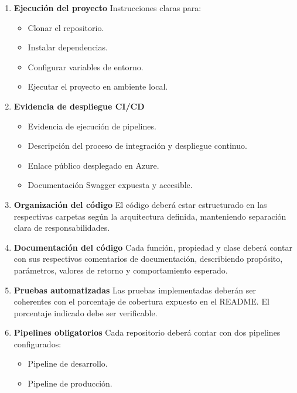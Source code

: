 \documentclass[12pt]{article}
\begin{document}
\begin{enumerate}
    \item \textbf{Ejecución del proyecto}  
    Instrucciones claras para:
    \begin{itemize}
        \item Clonar el repositorio.
        \item Instalar dependencias.
        \item Configurar variables de entorno.
        \item Ejecutar el proyecto en ambiente local.
    \end{itemize}

    \item \textbf{Evidencia de despliegue CI/CD}  
    \begin{itemize}
        \item Evidencia de ejecución de pipelines.
        \item Descripción del proceso de integración y despliegue continuo.
        \item Enlace público desplegado en Azure.
        \item Documentación Swagger expuesta y accesible.
    \end{itemize}

    \item \textbf{Organización del código}  
    El código deberá estar estructurado en las respectivas carpetas según la arquitectura definida, manteniendo separación clara de responsabilidades.

    \item \textbf{Documentación del código}  
    Cada función, propiedad y clase deberá contar con sus respectivos comentarios de documentación, describiendo propósito, parámetros, valores de retorno y comportamiento esperado.

    \item \textbf{Pruebas automatizadas}  
    Las pruebas implementadas deberán ser coherentes con el porcentaje de cobertura expuesto en el README. El porcentaje indicado debe ser verificable.

    \item \textbf{Pipelines obligatorios}  
    Cada repositorio deberá contar con dos pipelines configurados:
    \begin{itemize}
        \item Pipeline de desarrollo.
        \item Pipeline de producción.
    \end{itemize}
\end{enumerate}
\end{document}

